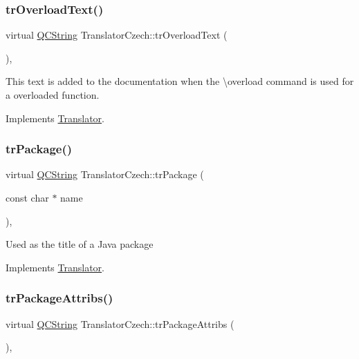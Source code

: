 \subsubsection{\texorpdfstring{trOverloadText()}{trOverloadText()}}
{\footnotesize\ttfamily virtual \mbox{\hyperlink{class_q_c_string}{Q\+C\+String}} Translator\+Czech\+::tr\+Overload\+Text (\begin{DoxyParamCaption}{ }\end{DoxyParamCaption})\hspace{0.3cm}{\ttfamily [inline]}, {\ttfamily [virtual]}}

This text is added to the documentation when the \textbackslash{}overload command is used for a overloaded function. 

Implements \mbox{\hyperlink{class_translator}{Translator}}.

\mbox{\label{class_translator_czech_adf360ff880c65efb4485989c4c806dc7}} 
\subsubsection{\texorpdfstring{trPackage()}{trPackage()}}
{\footnotesize\ttfamily virtual \mbox{\hyperlink{class_q_c_string}{Q\+C\+String}} Translator\+Czech\+::tr\+Package (\begin{DoxyParamCaption}\item[{const char $\ast$}]{name }\end{DoxyParamCaption})\hspace{0.3cm}{\ttfamily [inline]}, {\ttfamily [virtual]}}

Used as the title of a Java package 

Implements \mbox{\hyperlink{class_translator}{Translator}}.

\mbox{\label{class_translator_czech_a5cd1b4cfc102e8e0ae7768823aa46b91}} 
\subsubsection{\texorpdfstring{trPackageAttribs()}{trPackageAttribs()}}
{\footnotesize\ttfamily virtual \mbox{\hyperlink{class_q_c_string}{Q\+C\+String}} Translator\+Czech\+::tr\+Package\+Attribs (\begin{DoxyParamCaption}{ }\end{DoxyParamCaption})\hspace{0.3cm}{\ttfamily [inline]}, {\ttfamily [virtual]}}

